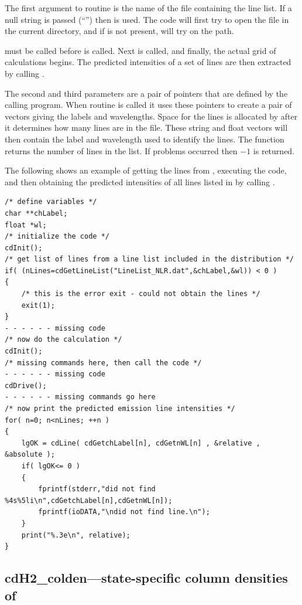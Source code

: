 The first argument to routine  is the name of the file
containing the line list.  If a null string is passed (``'') then
 is used.  The code will first try to open the file in the
current directory, and if is not present, will try on the path.

 must be called before  is called.
Next 
is called, and finally, the actual grid of calculations begins.  The
predicted intensities of a set of lines are then extracted by calling
.

The second and third parameters are a pair of pointers that are defined
by the calling program.
When routine  is called it uses these
pointers to create a pair of vectors giving the labels and wavelengths.
Space for the lines is allocated by  after it determines how
many lines are in the file.  These string and float vectors will then contain
the label and wavelength used to identify the lines.  The function returns
the number of lines in the list.  If problems occurred then $-1$ is returned.

The following shows an example of getting the lines from
,
executing the code, and then obtaining the predicted intensities of all
lines listed in 
by calling .
\begin{verbatim}
/* define variables */
char **chLabel;
float *wl;
/* initialize the code */
cdInit();
/* get list of lines from a line list included in the distribution */
if( (nLines=cdGetLineList("LineList_NLR.dat",&chLabel,&wl)) < 0 )
{
    /* this is the error exit - could not obtain the lines */
    exit(1);
}
- - - - - - missing code
/* now do the calculation */
cdInit();
/* missing commands here, then call the code */
- - - - - - missing code
cdDrive();
- - - - - - missing commands go here
/* now print the predicted emission line intensities */
for( n=0; n<nLines; ++n )
{
    lgOK = cdLine( cdGetchLabel[n], cdGetnWL[n] , &relative , &absolute );
    if( lgOK<= 0 )
    {
        fprintf(stderr,"did not find %4s%5li\n",cdGetchLabel[n],cdGetnWL[n]);
        fprintf(ioDATA,"\ndid not find line.\n");
    }
    print("%.3e\n", relative);
}
\end{verbatim}

\subsection{cdH2\_colden---state-specific column densities of \htwo}

